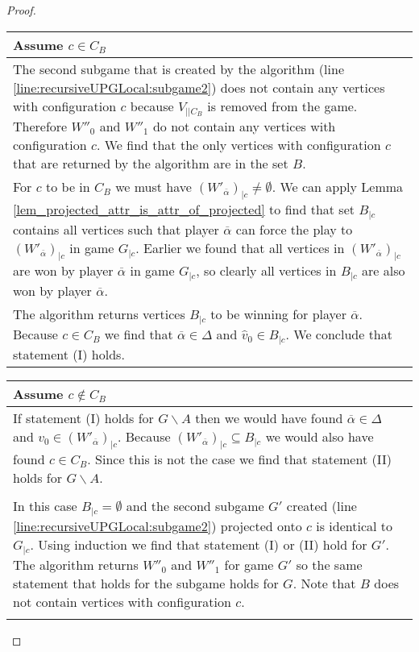 \begin{theorem}
\begin{proof}
		\begin{longtable}{|p{14.2cm}}
				Assume $c \in C_B$\\
				\hline
				The second subgame that is created by the algorithm (line \ref{line:recursiveUPGLocal:subgame2}) does not contain any vertices with configuration $c$ because $V_{||C_B}$ is removed from the game. Therefore $W''_0$ and $W''_1$ do not contain any vertices with configuration $c$. We find that the only vertices with configuration $c$ that are returned by the algorithm are in the set $B$.\\
				For $c$ to be in $C_B$ we must have $(W'_{\overline{\alpha}})_{|c} \neq \emptyset$. We can apply Lemma \ref{lem_projected_attr_is_attr_of_projected} to find that set $B_{|c}$ contains all vertices such that player $\overline{\alpha}$ can force the play to $(W'_{\overline{\alpha}})_{|c}$ in game $G_{|c}$. Earlier we found that all vertices in $(W'_{\overline{\alpha}})_{|c}$ are won by player $\overline{\alpha}$ in game $G_{|c}$, so clearly all vertices in $B_{|c}$ are also won by player $\overline{\alpha}$.\\
				The algorithm returns vertices $B_{|c}$ to be winning for player $\overline{\alpha}$. Because $c \in C_B$ we find that $\overline{\alpha} \in \Delta$ and $\hat{v}_0 \in B_{|c}$. We conclude that statement (I) holds.
		\end{longtable}
		\begin{longtable}{|p{14.2cm}}
			Assume $c \notin C_B$\\
			\hline
			If statement (I) holds for $G\backslash A$ then we would have found $\overline{\alpha} \in \Delta$ and $\hat{v}_0 \in (W'_{\overline{\alpha}})_{|c}$. Because $(W'_{\overline{\alpha}})_{|c} \subseteq B_{|c}$ we would also have found $c \in C_B$. Since this is not the case we find that statement (II) holds for $G\backslash A$.\\
			\begin{tabular}{|p{13.6cm}}
				Assume $(W'_{\overline{\alpha}})_{|c} = \emptyset$\\
				\hline
				In this case $B_{|c} = \emptyset$ and the second subgame $G'$ created (line \ref{line:recursiveUPGLocal:subgame2}) projected onto $c$ is identical to $G_{|c}$. Using induction we find that statement (I) or (II) hold for $G'$. The algorithm returns $W''_0$ and $W''_1$ for game $G'$ so the same statement that holds for the subgame holds for $G$. Note that $B$ does not contain vertices with configuration $c$.
			\end{tabular}\\\\

\end{longtable}
\end{proof}
\end{theorem}
